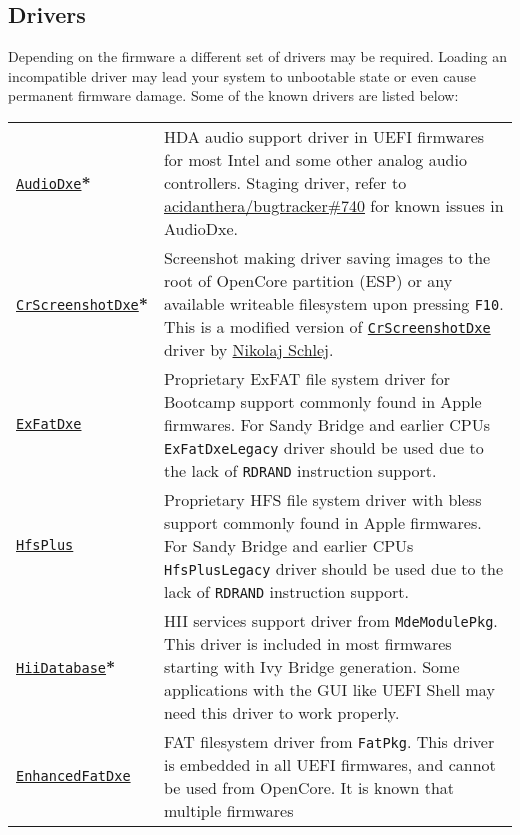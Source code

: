 \documentclass[]{article}
\begin{document}
\subsection{Drivers}\label{uefidrivers}

Depending on the firmware a different set of drivers may be required.
Loading an incompatible driver may lead your system to unbootable state or
even cause permanent firmware damage. Some of the known drivers are listed below:

\begin{tabular}{p{1.3in}p{5.55in}}
\href{https://github.com/acidanthera/OpenCorePkg}{\texttt{AudioDxe}}\textbf{*}
& HDA audio support driver in UEFI firmwares for most Intel and some other analog audio controllers.
  Staging driver, refer to \href{https://github.com/acidanthera/bugtracker/issues/740}{acidanthera/bugtracker\#740}
  for known issues in AudioDxe. \\
\href{https://github.com/acidanthera/OpenCorePkg}{\texttt{CrScreenshotDxe}}\textbf{*}
& Screenshot making driver saving images to the root of OpenCore partition (ESP) or
  any available writeable filesystem upon pressing \texttt{F10}.
  This is a modified version of \href{https://github.com/LongSoft/CrScreenshotDxe}{\texttt{CrScreenshotDxe}}
  driver by \href{https://github.com/NikolajSchlej}{Nikolaj Schlej}. \\
\href{https://github.com/acidanthera/OcBinaryData}{\texttt{ExFatDxe}}
& Proprietary ExFAT file system driver for Bootcamp support commonly found in Apple
  firmwares. For Sandy Bridge and earlier CPUs \texttt{ExFatDxeLegacy} driver should be
  used due to the lack of \texttt{RDRAND} instruction support. \\
\href{https://github.com/acidanthera/OcBinaryData}{\texttt{HfsPlus}}
& Proprietary HFS file system driver with bless support commonly found in Apple
  firmwares. For Sandy Bridge and earlier CPUs \texttt{HfsPlusLegacy} driver should be
  used due to the lack of \texttt{RDRAND} instruction support. \\
\href{https://github.com/acidanthera/audk}{\texttt{HiiDatabase}}\textbf{*}
& HII services support driver from \texttt{MdeModulePkg}. This driver is included in
  most firmwares starting with Ivy Bridge generation. Some applications with the GUI
  like UEFI Shell may need this driver to work properly. \\
\href{https://github.com/acidanthera/audk}{\texttt{EnhancedFatDxe}}
& FAT filesystem driver from \texttt{FatPkg}. This driver is embedded in all
  UEFI firmwares, and cannot be used from OpenCore. It is known that multiple firmwares

\end{tabular}
\end{document}
